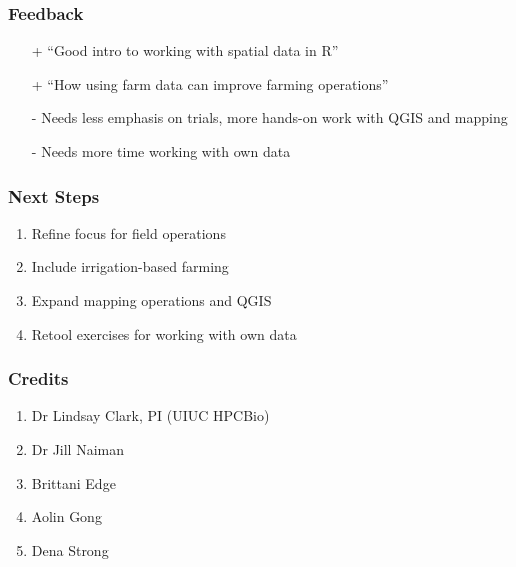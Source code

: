 \documentclass[11pt]{beamer}
\begin{document}
\begin{frame}[fragile]
\frametitle{Feedback}
  \begin{enumerate}[label=\arabic*]
    \item[+]  “Good intro to working with spatial data in R”
    \item[+]  “How using farm data can improve farming operations”
    \item[-]  Needs less emphasis on trials, more hands-on work with QGIS and mapping
    \item[-]  Needs more time working with own data
  \end{enumerate}
\end{frame}

\begin{frame}[fragile]
\frametitle{Next Steps}
  \begin{enumerate}[label=\arabic*]
    \item  Refine focus for field operations
    \item  Include irrigation-based farming
    \item  Expand mapping operations and QGIS
    \item  Retool exercises for working with own data
  \end{enumerate}
\end{frame}

\begin{frame}[fragile]
\frametitle{Credits}
  \begin{enumerate}[label=\arabic*]
    \item  Dr Lindsay Clark, PI (UIUC HPCBio)
    \item  Dr Jill Naiman
    \item  Brittani Edge  %
    \item  Aolin Gong
    \item  Dena Strong
  \end{enumerate}
\end{frame}
\end{document}
